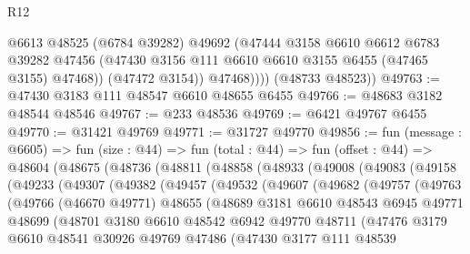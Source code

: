 \begin{lexlean}{R12}
\begin{coremodule}
                @6613
                @48525
                (@6784 @39282)
                @49692
                (@47444
                  @3158
                  @6610
                  @6612
                  @6783
                  @39282
                  @47456
                  (@47430 @3156 @111 @6610 @6610 @3155 @6455 (@47465 @3155) @47468))
                (@47472 @3154))
              @47468))))
      (@48733 @48523))
@49763 := @47430 @3183 @111 @48547 @6610 @48655 @6455
@49766 := @48683 @3182 @48544 @48546
@49767 := @233 @48536
@49769 := @6421 @49767 @6455
@49770 := @31421 @49769
@49771 := @31727 @49770
@49856 := fun (message : @6605) =>
  fun (size : @44) =>
  fun (total : @44) =>
  fun (offset : @44) =>
  @48604
    (@48675
      (@48736
        (@48811
          (@48858
            (@48933
              (@49008
                (@49083
                  (@49158
                    (@49233
                      (@49307
                        (@49382
                          (@49457
                            (@49532
                              (@49607
                                (@49682
                                  (@49757
                                    (@49763
                                      (@49766
                                        (@46670 @49771)
                                        @48655
                                        (@48689
                                          @3181
                                          @6610
                                          @48543
                                          @6945
                                          @49771
                                          @48699
                                          (@48701
                                            @3180
                                            @6610
                                            @48542
                                            @6942
                                            @49770
                                            @48711
                                            (@47476
                                              @3179
                                              @6610
                                              @48541
                                              @30926
                                              @49769
                                              @47486
                                              (@47430
                                                @3177
                                                @111
                                                @48539

\end{coremodule}
\end{lexlean}
